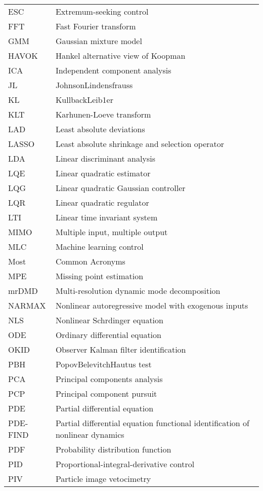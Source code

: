 \begin{table}[h]
\begin{center}
\begin{tabular}{|p{4.0cm}|p{12.0cm}|}
ESC  & Extremum-seeking control \\
FFT  & Fast Fourier transform \\
GMM  & Gaussian mixture model \\
HAVOK  & Hankel alternative view of Koopman \\
ICA  & Independent component analysis \\
JL  & JohnsonLindensfrauss \\
KL  & KullbackLeib1er \\
KLT  & Karhunen-Loeve transform \\
LAD  & Least absolute deviations \\
LASSO  & Least absolute shrinkage and selection operator \\
LDA  & Linear discriminant analysis \\
LQE  & Linear quadratic estimator \\
LQG  & Linear quadratic Gaussian controller \\
LQR  & Linear quadratic regulator \\
LTI  & Linear time invariant system \\
MIMO  & Multiple input, multiple output \\
MLC  & Machine learning control \\
Most  & Common Acronyms \\
MPE  & Missing point estimation \\
mrDMD  & Multi-resolution dynamic mode decomposition \\
NARMAX  & Nonlinear autoregressive model with exogenous inputs \\
NLS  & Nonlinear Schrdinger equation \\
ODE  & Ordinary differential equation \\
OKID  & Observer Kalman filter identification \\
PBH  & PopovBelevitchHautus test \\
PCA  & Principal components analysis \\
PCP  & Principal component pursuit \\
PDE  & Partial differential equation \\
PDE-FIND  & Partial differential equation functional identification of nonlinear dynamics \\
PDF  & Probability distribution function \\
PID  & Proportional-integral-derivative control \\
PIV  & Particle image vetocimetry \\

\end{tabular}
\end{center}
\end{table}
